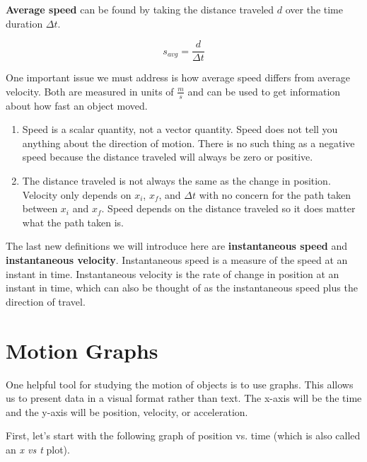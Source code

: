 \documentclass[12pt]{book}
\begin{document}
\textbf{Average speed} can be found by taking the distance traveled $d$ over the time duration $\Delta t$.

\begin{equation}
s_{avg} = \frac{d}{\Delta t}
\end{equation}

One important issue we must address is how average speed differs from average velocity. Both are measured in units of $\frac{m}{s}$ and can be used to get information about how fast an object moved.

\begin{enumerate}
\item Speed is a scalar quantity, not a vector quantity. Speed does not tell you anything about the direction of motion. There is no such thing as a negative speed because the distance traveled will always be zero or positive.

\item The distance traveled is not always the same as the change in position. Velocity only depends on $x_i$, $x_f$, and $\Delta t$ with no concern for the path taken between $x_i$ and $x_f$. Speed depends on the distance traveled so it does matter what the path taken is.
\end{enumerate}

The last new definitions we will introduce here are \textbf{instantaneous speed} and \textbf{instantaneous velocity}. Instantaneous speed is a measure of the speed at an instant in time. Instantaneous velocity is the rate of change in position at an instant in time, which can also be thought of as the instantaneous speed plus the direction of travel.

\section{Motion Graphs}

One helpful tool for studying the motion of objects is to use graphs. This allows us to present data in a visual format rather than text. The x-axis will be the time and the y-axis will be position, velocity, or acceleration.

First, let's start with the following graph of position vs. time (which is also called an \textit{x vs t} plot).
\end{document}
